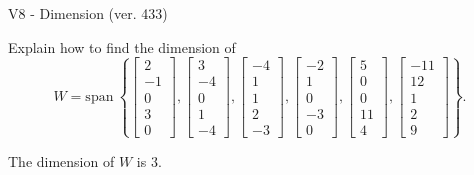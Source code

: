 \begin{exercise}
  \begin{exerciseTitle}V8 - Dimension (ver. 433)\end{exerciseTitle}
  \begin{exerciseStatement}
    Explain how to find the dimension of 
\[W=\mathrm{span}\ \left\{\left[\begin{array}{r}
2 \\
-1 \\
0 \\
3 \\
0
\end{array}\right] , \left[\begin{array}{r}
3 \\
-4 \\
0 \\
1 \\
-4
\end{array}\right] , \left[\begin{array}{r}
-4 \\
1 \\
1 \\
2 \\
-3
\end{array}\right] , \left[\begin{array}{r}
-2 \\
1 \\
0 \\
-3 \\
0
\end{array}\right] , \left[\begin{array}{r}
5 \\
0 \\
0 \\
11 \\
4
\end{array}\right] , \left[\begin{array}{r}
-11 \\
12 \\
1 \\
2 \\
9
\end{array}\right]\right\}.\]



  \end{exerciseStatement}
  \begin{exerciseAnswer}
   The dimension of \(W\) is  \(3\).
  


  \end{exerciseAnswer}
\end{exercise}